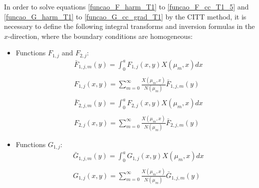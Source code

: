 \documentclass[12pt]{CHT-20}
\begin{document}
In order to solve equations \eqref{funcao_F_harm_T1} to \eqref{funcao_F_cc_T1_5} and \eqref{funcao_G_harm_T1} to \eqref{funcao_G_cc_grad_T1} by the CITT method, it is necessary to define the following integral transforms and inversion formulas \citep{livro_integral_transforms_cotta} in the $x$-direction, where the boundary conditions are homogeneous:
\begin{itemize}
	\item Functions $F_{1, j}$ and $F_{2, j}$:
	\begin{subequations}
		\begin{align}
		& \bar{F}_{1,j,m}(y) = \int_0^a F_{1, j}(x, y) X(\mu_m, x) dx \label{definicao_da_transf_F1}  \\ \nonumber \\
		& F_{1, j}(x, y) = \sum_{m=0}^\infty \frac{X(\mu_m, x)}{N(\mu_m)}\bar{F}_{1,j,m}(y) \label{definicao_da_transf_inv_F1}	 \\ \nonumber \\
		& \bar{F}_{2,j,m}(y) = \int_0^a F_{2, j}(x, y) X(\mu_m, x) dx \label{definicao_da_transf_F2}  \\ \nonumber \\
		& F_{2, j}(x, y) = \sum_{m=0}^\infty \frac{X(\mu_m, x)}{N(\mu_m)}\bar{F}_{2,j,m}(y) \label{definicao_da_transf_inv_F2}	
		\end{align}
	\end{subequations}
	\item Functions $G_{1, j}$:
	\begin{subequations}
		\begin{align}
		& \bar{G}_{1,j,m}(y) = \int_0^a G_{1, j}(x, y) X(\mu_m, x) dx \label{definicao_da_transf_G1}  \\ \nonumber \\
		& G_{1, j}(x, y) = \sum_{m=0}^\infty \frac{X(\mu_m, x)}{N(\mu_m)}\bar{G}_{1,j,m}(y) \label{definicao_da_transf_inv_G1}		
		\end{align}
	\end{subequations}
\end{itemize}
\end{document}
